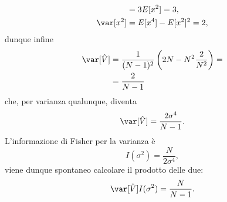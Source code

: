 \begin{solution}
\begin{align*}
		&= 3E[x^2] = 3, \\
		\var[x^2]
		&= E[x^4] - E[x^2]^2
		= 2,
	\end{align*}
	dunque infine
	\begin{align*}
		\var[\hat V]
		&= \frac1{(N-1)^2} \left( 2N - N^2 \frac2{N^2} \right) = \\
		&= \frac2{N-1}
	\end{align*}
	che, per varianza qualunque, diventa
	\begin{equation*}
		\var[\hat V]
		= \frac{2\sigma^4}{N-1}.
	\end{equation*}
	L'informazione di Fisher per la varianza è
	\begin{equation*}
		I(\sigma^2)
		= \frac N{2\sigma^4},
	\end{equation*}
	viene dunque spontaneo calcolare il prodotto delle due:
	\begin{equation*}
		\var[\hat V]I(\sigma^2)
		= \frac N{N-1}.
	\end{equation*}
\end{solution}
